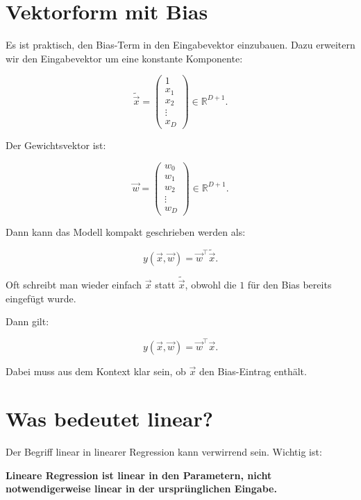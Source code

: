 \section{Vektorform mit Bias}

Es ist praktisch, den Bias-Term in den Eingabevektor einzubauen.
Dazu erweitern wir den Eingabevektor um eine konstante Komponente:

\[
    \tilde{\vec{x}}
    =
    \begin{pmatrix}
        1 \\
        x_1 \\
        x_2 \\
        \vdots \\
        x_D
    \end{pmatrix}
    \in \mathbb{R}^{D+1}.
\]

Der Gewichtsvektor ist:

\[
    \vec{w}
    =
    \begin{pmatrix}
        w_0 \\
        w_1 \\
        w_2 \\
        \vdots \\
        w_D
    \end{pmatrix}
    \in \mathbb{R}^{D+1}.
\]

Dann kann das Modell kompakt geschrieben werden als:

\[
    y(\vec{x},\vec{w})
    =
    \vec{w}^{\top}\tilde{\vec{x}}.
\]

\begin{notebox}
Oft schreibt man wieder einfach \(\vec{x}\) statt \(\tilde{\vec{x}}\), obwohl die \(1\) für den Bias bereits eingefügt wurde.

Dann gilt:

\[
    y(\vec{x},\vec{w})
    =
    \vec{w}^{\top}\vec{x}.
\]

Dabei muss aus dem Kontext klar sein, ob \(\vec{x}\) den Bias-Eintrag enthält.
\end{notebox}

\section{Was bedeutet linear?}

Der Begriff linear in linearer Regression kann verwirrend sein.
Wichtig ist:

\begin{center}
\textbf{Lineare Regression ist linear in den Parametern, nicht notwendigerweise linear in der ursprünglichen Eingabe.}
\end{center}

